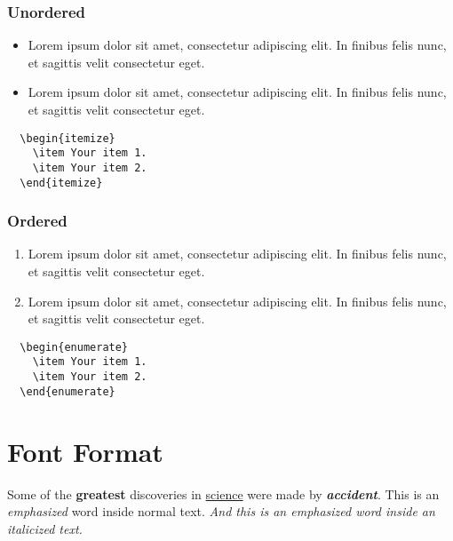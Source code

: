 \subsubsection{Unordered}

\begin{itemize}
  \item Lorem ipsum dolor sit amet, consectetur adipiscing elit. In finibus felis nunc, et sagittis velit consectetur eget.
  \item Lorem ipsum dolor sit amet, consectetur adipiscing elit. In finibus felis nunc, et sagittis velit consectetur eget.
\end{itemize}

\begin{lstlisting}
  \begin{itemize}
    \item Your item 1.
    \item Your item 2.
  \end{itemize}
\end{lstlisting}

\subsubsection{Ordered}

\begin{enumerate}
  \item Lorem ipsum dolor sit amet, consectetur adipiscing elit. In finibus felis nunc, et sagittis velit consectetur eget.
  \item Lorem ipsum dolor sit amet, consectetur adipiscing elit. In finibus felis nunc, et sagittis velit consectetur eget.
\end{enumerate}

\begin{lstlisting}
  \begin{enumerate}
    \item Your item 1.
    \item Your item 2.
  \end{enumerate}
\end{lstlisting}

\section{Font Format}
 
Some of the \textbf{greatest} discoveries in \underline{science} were made by \textbf{\textit{accident}}. This is an \emph{emphasized} word inside normal text. \textit{And this is an \emph{emphasized} word inside an italicized text.}


